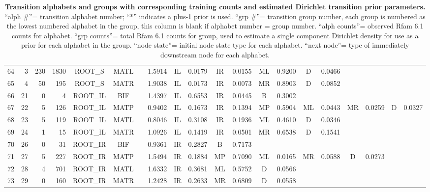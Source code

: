 \documentclass[11pt]{article}
\renewcommand{\baselinestretch}{1.5}
\renewcommand{\baselinestretch}{1.5}
\begin{document}
\begin{table}
\begin{center}
\begin{tabular}{|rr|rr|cc|c|c|cc|cc|cc|cc|cc|cc|}
64  & 3  & 230   & 1830  & ROOT\_S  & MATL & & 1.5914  & IL & 0.0179 & IR & 0.0155 & ML & 0.9200 & D  & 0.0466 &    &  &  &  \\  
65  & 4  & 50    & 195   & ROOT\_S  & MATR & & 1.9038  & IL & 0.0173 & IR & 0.0073 & MR & 0.8903 & D  & 0.0852 &    &  &  &  \\  
66  & 21 & 0     & 4     & ROOT\_IL & BIF  & & 1.4397  & IL & 0.6553 & IR & 0.0445 & B  & 0.3002 &    &        &    &  &  &  \\  
67  & 22 & 5     & 126   & ROOT\_IL & MATP & & 0.9402  & IL & 0.1673 & IR & 0.1394 & MP & 0.5904 & ML & 0.0443 & MR & 0.0259 & D & 0.0327 \\  
68  & 23 & 5     & 119   & ROOT\_IL & MATL & & 0.8046  & IL & 0.3108 & IR & 0.1936 & ML & 0.4610 & D  & 0.0346 &    &  &  &  \\  
69  & 24 & 1     & 15    & ROOT\_IL & MATR & & 1.0926  & IL & 0.1419 & IR & 0.0501 & MR & 0.6538 & D  & 0.1541 &    &  &  &  \\  
70  & 26 & 0     & 31    & ROOT\_IR & BIF  & & 0.9361  & IR & 0.2827 & B  & 0.7173 &    &        &    &        &    &  &  &  \\  
71  & 27 & 5     & 227   & ROOT\_IR & MATP & & 1.5494  & IR & 0.1884 & MP & 0.7090 & ML & 0.0165 & MR & 0.0588 & D  & 0.0273 &  &  \\  
72  & 28 & 4     & 701   & ROOT\_IR & MATL & & 1.6332  & IR & 0.3681 & ML & 0.5752 & D  & 0.0566 &    &        &    &  &  &  \\  
73  & 29 & 0     & 160   & ROOT\_IR & MATR & & 1.2428  & IR & 0.2633 & MR & 0.6809 & D  & 0.0558 &    &        &    &  &  &  \\   \cline{1-6} \cline {8-20} 
\end{tabular}
\end{center}

\normalfont\rmfamily
\caption{\textbf{Transition alphabets and groups with corresponding
    training counts and estimated Dirichlet transition prior parameters.}
  ``alph \#''= transition alphabet number; ``*'' indicates a plus-1
  prior is used. ``grp \#''= transition
  group number, each group is numbered as the lowest numbered alphabet in
  the group, this column is blank if alphabet number = group
  number. ``alph counts''= observed Rfam 6.1 counts for
  alphabet. ``grp counts''= total Rfam 6.1 counts for group, used
  to estimate a single component Dirichlet density for use as a prior
  for each alphabet in the group. ``node state''= initial node state
  type for each alphabet. ``next node''= type of immediately downstream
  node for each alphabet.}

\label{tbl:transitions}
\end{table}
\renewcommand{\baselinestretch}{1.5}
\fi
\end{document}
